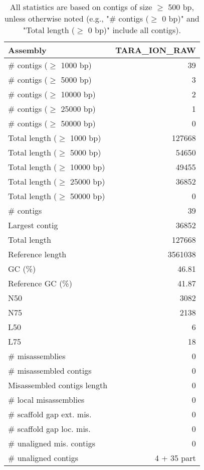 \documentclass[12pt,a4paper]{article}
\begin{document}
\begin{table}[ht]
\begin{center}
\caption{All statistics are based on contigs of size $\geq$ 500 bp, unless otherwise noted (e.g., "\# contigs ($\geq$ 0 bp)" and "Total length ($\geq$ 0 bp)" include all contigs).}
\begin{tabular}{|l*{1}{|r}|}
\hline
Assembly & TARA\_ION\_RAW \\ \hline
\# contigs ($\geq$ 1000 bp) & 39 \\ \hline
\# contigs ($\geq$ 5000 bp) & 3 \\ \hline
\# contigs ($\geq$ 10000 bp) & 2 \\ \hline
\# contigs ($\geq$ 25000 bp) & 1 \\ \hline
\# contigs ($\geq$ 50000 bp) & 0 \\ \hline
Total length ($\geq$ 1000 bp) & 127668 \\ \hline
Total length ($\geq$ 5000 bp) & 54650 \\ \hline
Total length ($\geq$ 10000 bp) & 49455 \\ \hline
Total length ($\geq$ 25000 bp) & 36852 \\ \hline
Total length ($\geq$ 50000 bp) & 0 \\ \hline
\# contigs & 39 \\ \hline
Largest contig & 36852 \\ \hline
Total length & 127668 \\ \hline
Reference length & 3561038 \\ \hline
GC (\%) & 46.81 \\ \hline
Reference GC (\%) & 41.87 \\ \hline
N50 & 3082 \\ \hline
N75 & 2138 \\ \hline
L50 & 6 \\ \hline
L75 & 18 \\ \hline
\# misassemblies & 0 \\ \hline
\# misassembled contigs & 0 \\ \hline
Misassembled contigs length & 0 \\ \hline
\# local misassemblies & 0 \\ \hline
\# scaffold gap ext. mis. & 0 \\ \hline
\# scaffold gap loc. mis. & 0 \\ \hline
\# unaligned mis. contigs & 0 \\ \hline
\# unaligned contigs & 4 + 35 part \\ \hline

\end{tabular}
\end{center}
\end{table}
\end{document}

